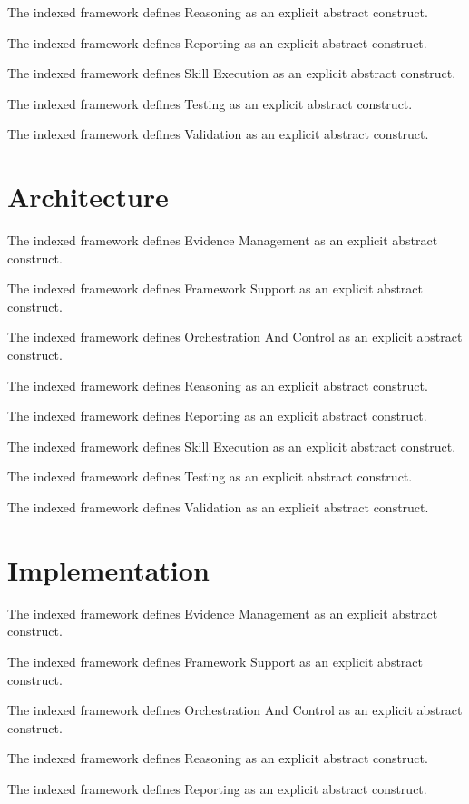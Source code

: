 \documentclass[11pt]{article}
\begin{document}
The indexed framework defines Reasoning as an explicit abstract construct.

The indexed framework defines Reporting as an explicit abstract construct.

The indexed framework defines Skill Execution as an explicit abstract construct.

The indexed framework defines Testing as an explicit abstract construct.

The indexed framework defines Validation as an explicit abstract construct.

\section{Architecture}

The indexed framework defines Evidence Management as an explicit abstract construct.

The indexed framework defines Framework Support as an explicit abstract construct.

The indexed framework defines Orchestration And Control as an explicit abstract construct.

The indexed framework defines Reasoning as an explicit abstract construct.

The indexed framework defines Reporting as an explicit abstract construct.

The indexed framework defines Skill Execution as an explicit abstract construct.

The indexed framework defines Testing as an explicit abstract construct.

The indexed framework defines Validation as an explicit abstract construct.

\section{Implementation}

The indexed framework defines Evidence Management as an explicit abstract construct.

The indexed framework defines Framework Support as an explicit abstract construct.

The indexed framework defines Orchestration And Control as an explicit abstract construct.

The indexed framework defines Reasoning as an explicit abstract construct.

The indexed framework defines Reporting as an explicit abstract construct.
\end{document}
